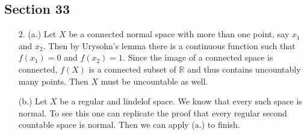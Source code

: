 \documentclass[11pt, reqno]{article}
\theoremstyle{plain}
\theoremstyle{definition}
\theoremstyle{remark}
\newcommand{\RR}{\mathbb{R}}
\begin{document}
\subsection*{Section 33}

\begin{enumerate}
    \item[2.] (a.) Let $X$ be a connected normal space with more than one point, say $x_1$ and $x_2$. Then
    by Urysohn's lemma there is a continuous function such that $f(x_1) = 0$ and $f(x_2) = 1$. Since the 
    image of a connected space is connected, $f(X)$ is a connected subset of $\RR$ and thus contains 
    uncountably many points. Then $X$ must be uncountable as well.

    (b.) Let $X$ be a regular and lindelof space. We know that every such space is normal. To see this one 
    can replicate the proof that every regular second countable space is normal. Then we can apply (a.) 
    to finish.
\end{enumerate}
\end{document}
